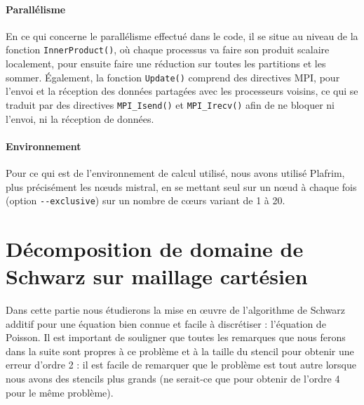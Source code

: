 \documentclass[a4paper,11pt]{article}
\begin{document}
\paragraph{Parallélisme} En ce qui concerne le parallélisme effectué dans le code, il se situe au niveau de la fonction \texttt{InnerProduct()}, où chaque processus va faire son produit scalaire localement, pour ensuite faire une réduction sur toutes les partitions et les sommer. Également, la fonction \texttt{Update()} comprend des directives MPI, pour l'envoi et la réception des données partagées avec les processeurs voisins, ce qui se traduit par des directives \texttt{MPI\_Isend()} et \texttt{MPI\_Irecv()} afin de ne bloquer ni l'envoi, ni la réception de données.


\paragraph{Environnement} Pour ce qui est de l'environnement de calcul utilisé, nous avons utilisé Plafrim, plus précisément les n\oe uds mistral, en se mettant seul sur un n\oe ud à chaque fois (option \texttt{{-}{-}exclusive}) sur un nombre de c\oe urs variant de 1 à 20.


\section{Décomposition de domaine de Schwarz sur maillage cartésien}

\noindent Dans cette partie nous étudierons la mise en \oe uvre de l'algorithme de Schwarz additif pour une équation bien connue et facile à discrétiser : l'équation de Poisson. Il est important de souligner que toutes les remarques que nous ferons dans la suite sont propres à ce problème et à la taille du stencil pour obtenir une erreur d'ordre 2 : il est facile de remarquer que le problème est tout autre lorsque nous avons des stencils plus grands (ne serait-ce que pour obtenir de l'ordre 4 pour le même problème). 
\end{document}
